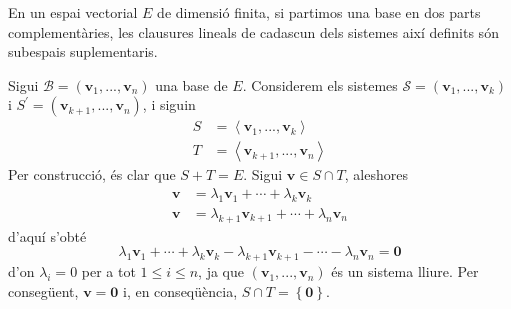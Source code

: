 \begin{teorema}
En un espai vectorial $E$ de dimensió finita, si partimos
una base en dos parts complementàries, les clausures lineals de cadascun
dels sistemes així definits són subespais suplementaris.

\end{teorema}
\begin{prova}
Sigui $\mathcal{B}=(\mathbf{v}_{1},...,\mathbf{v}_{n})$ una base de $E
$. Considerem els sistemes $\mathcal{S}=(\mathbf{v}_{1},...,\mathbf{v}%
_{k}) $ i $S^{\prime }=(\mathbf{v}_{k+1},...,\mathbf{v}_{n})$, i
siguin 
\begin{align*}
S &=\left\langle \mathbf{v}_{1},...,\mathbf{v}_{k}\right\rangle \\
T &=\left\langle \mathbf{v}_{k+1},...,\mathbf{v}_{n}\right\rangle
\end{align*}%
Per construcció, és clar que $S+T=E$. Sigui $%
\mathbf{v}\in S\cap T$, aleshores%
\begin{align*}
\mathbf{v} &=\lambda _{1}\mathbf{v}_{1}+\cdots +\lambda _{k}\mathbf{v}_{k}
\\
\mathbf{v} &=\lambda _{k+1}\mathbf{v}_{k+1}+\cdots +\lambda _{n}\mathbf{v}%
_{n}
\end{align*}%
d’aquí s’obté%
\begin{equation*}
\lambda _{1}\mathbf{v}_{1}+\cdots +\lambda _{k}\mathbf{v}_{k}-\lambda _{k+1}%
\mathbf{v}_{k+1}-\cdots -\lambda _{n}\mathbf{v}_{n}=\mathbf{0}
\end{equation*}%
d’on $\lambda _{i}=0$ per a tot $1\leq i\leq n$, ja que $(\mathbf{v}%
_{1},...,\mathbf{v}_{n})$ és un sistema lliure. Per consegüent, $\mathbf{v}=%
\mathbf{0}$ i, en conseqüència, $S\cap T=\left\{ \mathbf{0}%
\right\} $.
\end{prova}

